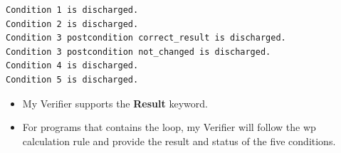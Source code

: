 \documentclass[a0,landscape]{a0poster}
\def\graphspacing{\vspace{.5cm}}
\newcommand{\capcolor}[1]{{\color{Black} #1}}
\newcommand{\var}[1]{{\small \textit{#1}}}
\begin{document}
\begin{multicols}{4}
\begin{lstlisting}
Condition 1 is discharged.
Condition 2 is discharged.
Condition 3 postcondition correct_result is discharged.
Condition 3 postcondition not_changed is discharged.
Condition 4 is discharged.
Condition 5 is discharged.
\end{lstlisting}
\begin{itemize}
\item My Verifier supports the {\bf Result} keyword.
\item For programs that contains the loop, my Verifier will follow the wp calculation rule and provide the result and status of the five conditions.
\end{itemize}
%
%
%
%
%
%
%



\end{multicols}
\end{document}
